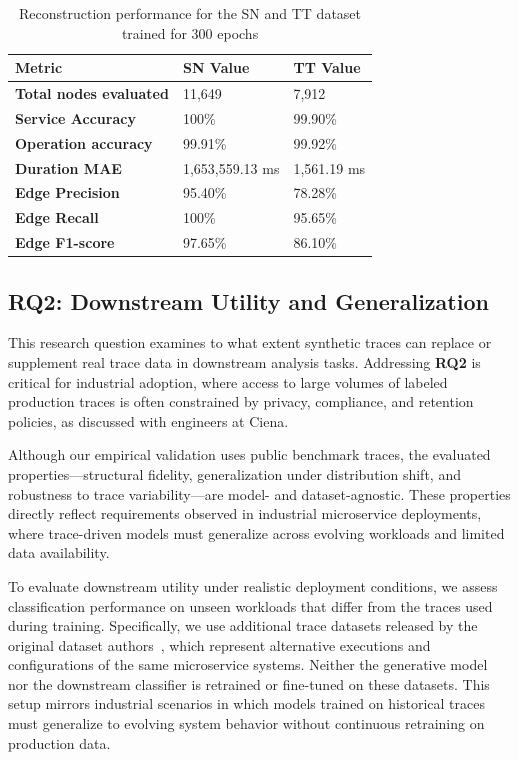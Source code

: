 \documentclass[sigconf,review]{acmart}
\begin{document}
\begin{table}
    \centering
    
    \begin{tabular}{lll}
        \textbf{Metric} & \textbf{SN Value} & \textbf{TT Value} \\
        \hline
        \textbf{Total nodes evaluated} & 11,649 & 7,912 \\
        \textbf{Service Accuracy} & 100\% & 99.90\% \\
        \textbf{Operation accuracy} & 99.91\% & 99.92\% \\
        \textbf{Duration MAE} & 1,653,559.13 ms & 1,561.19 ms  \\
        \textbf{Edge Precision} & 95.40\% & 78.28\% \\
        \textbf{Edge Recall} & 100\% & 95.65\% \\
        \textbf{Edge F1-score} & 97.65\% & 86.10\% \\
    \end{tabular}
    
    \caption{Reconstruction performance for the SN and TT dataset trained for 300 epochs}
    \label{tab:sn-tt-recon}
\end{table}


\subsection{RQ2: Downstream Utility and Generalization}
\label{sec:rq2}

This research question examines to what extent synthetic traces can replace or supplement real trace data in downstream analysis tasks. Addressing \textbf{RQ2} is critical for industrial adoption, where access to large volumes of labeled production traces is often constrained by privacy, compliance, and retention policies, as discussed with engineers at Ciena.

Although our empirical validation uses public benchmark traces, the evaluated properties—structural fidelity, generalization under distribution shift, and robustness to trace variability—are model- and dataset-agnostic. These properties directly reflect requirements observed in industrial microservice deployments, where trace-driven models must generalize across evolving workloads and limited data availability.

To evaluate downstream utility under realistic deployment conditions, we assess classification performance on unseen workloads that differ from the traces used during training. Specifically, we use additional trace datasets released by the original dataset authors~\cite{DBLP:conf/icse/LeeYCSL23}, which represent alternative executions and configurations of the same microservice systems. Neither the generative model nor the downstream classifier is retrained or fine-tuned on these datasets. This setup mirrors industrial scenarios in which models trained on historical traces must generalize to evolving system behavior without continuous retraining on production data.
\end{document}
